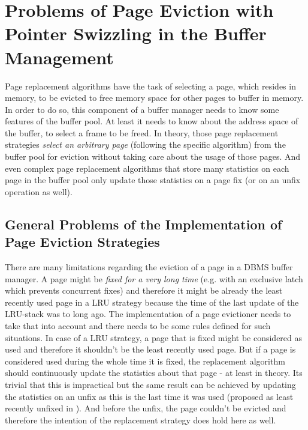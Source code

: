 \section[Problems of Page Eviction with Pointer Swizzling]{Problems of Page Eviction with Pointer Swizzling in the Buffer Management}

    Page replacement algorithms have the task of selecting a page, which resides in memory, to be evicted to free memory space for other pages to buffer in memory. In order to do so, this component of a buffer manager needs to know some features of the buffer pool. At least it needs to know about the address space of the buffer, to select a frame to be freed. In theory, those page replacement strategies \emph{select an arbitrary page} (following the specific algorithm) from the buffer pool for eviction without taking care about the usage of those pages. And even complex page replacement algorithms that store many statistics on each page in the buffer pool only update those statistics on a page fix (or on an unfix operation as well). 

\subsection[General Problems of the Implementation]{General Problems of the Implementation of Page Eviction Strategies}

    There are many limitations regarding the eviction of a page in a DBMS buffer manager. A page might be \emph{fixed for a very long time} (e.g. with an exclusive latch which prevents concurrent fixes) and therefore it might be already the least recently used page in a LRU strategy because the time of the last update of the LRU-stack was to long ago. The implementation of a page evictioner needs to take that into account and there needs to be some rules defined for such situations. In case of a LRU strategy, a page that is fixed might be considered as used and therefore it shouldn't be the least recently used page. But if a page is considered used during the whole time it is fixed, the replacement algorithm should continuously update the statistics about that page - at least in theory. Its trivial that this is impractical but the same result can be achieved by updating the statistics on an unfix as this is the last time it was used (proposed as least recently unfixed in \cite{Effelsberg:1984}). And before the unfix, the page couldn't be evicted and therefore the intention of the replacement strategy does hold here as well.

